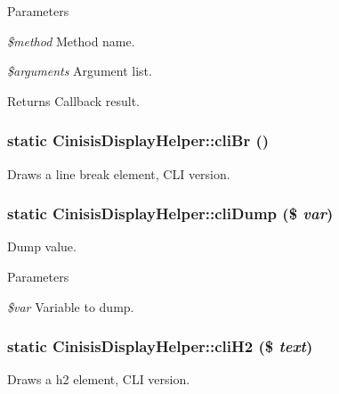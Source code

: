 \begin{DoxyParams}{Parameters}
\item[{\em \$method}]Method name.\item[{\em \$arguments}]Argument list.\end{DoxyParams}
\begin{DoxyReturn}{Returns}
Callback result. 
\end{DoxyReturn}
\hypertarget{classCinisisDisplayHelper_ad61db99c9d639678c96879aa34288323}{
\subsubsection[{cliBr}]{\setlength{\rightskip}{0pt plus 5cm}static CinisisDisplayHelper::cliBr ()}}
\label{classCinisisDisplayHelper_ad61db99c9d639678c96879aa34288323}
Draws a line break element, CLI version. \hypertarget{classCinisisDisplayHelper_abd525c7b612f9dce348bb1479470b445}{
\subsubsection[{cliDump}]{\setlength{\rightskip}{0pt plus 5cm}static CinisisDisplayHelper::cliDump (\$ {\em var})}}
\label{classCinisisDisplayHelper_abd525c7b612f9dce348bb1479470b445}
Dump value.


\begin{DoxyParams}{Parameters}
\item[{\em \$var}]Variable to dump. \end{DoxyParams}
\hypertarget{classCinisisDisplayHelper_aa15ca1975a280814a1cdc2df82b8c67d}{
\subsubsection[{cliH2}]{\setlength{\rightskip}{0pt plus 5cm}static CinisisDisplayHelper::cliH2 (\$ {\em text})}}
\label{classCinisisDisplayHelper_aa15ca1975a280814a1cdc2df82b8c67d}
Draws a h2 element, CLI version.



